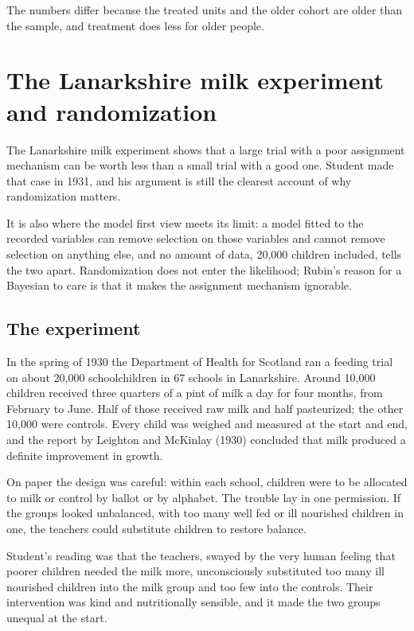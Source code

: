 

The numbers differ because the treated units and the older cohort are older than the sample, and treatment does less for older people. 

\section{The Lanarkshire milk experiment and randomization}\label{sec:milk}

The Lanarkshire milk experiment shows that a large trial with a poor assignment mechanism can be worth less than a small trial with a good one. Student made that case in 1931, and his argument is still the clearest account of why randomization matters.

It is also where the model first view meets its limit: a model fitted to the recorded variables can remove selection on those variables and cannot remove selection on anything else, and no amount of data, 20,000 children included, tells the two apart. Randomization does not enter the likelihood; Rubin's reason for a Bayesian to care is that it makes the assignment mechanism ignorable.

\subsection{The experiment}

In the spring of 1930 the Department of Health for Scotland ran a feeding trial on about 20,000 schoolchildren in 67 schools in Lanarkshire. Around 10,000 children received three quarters of a pint of milk a day for four months, from February to June. Half of those received raw milk and half pasteurized; the other 10,000 were controls. Every child was weighed and measured at the start and end, and the report by Leighton and McKinlay (1930) concluded that milk produced a definite improvement in growth.

On paper the design was careful: within each school, children were to be allocated to milk or control by ballot or by alphabet. The trouble lay in one permission. If the groups looked unbalanced, with too many well fed or ill nourished children in one, the teachers could substitute children to restore balance.

Student's reading was that the teachers, swayed by the very human feeling that poorer children needed the milk more, unconsciously substituted too many ill nourished children into the milk group and too few into the controls. Their intervention was kind and nutritionally sensible, and it made the two groups unequal at the start.

